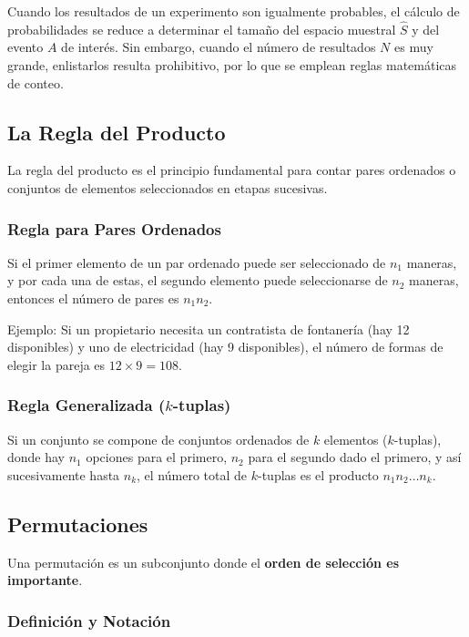 \documentclass[a4paper]{article}
\begin{document}
Cuando los resultados de un experimento son igualmente probables, el cálculo de probabilidades se reduce a determinar el tamaño del espacio muestral $\hat{S}$ y del evento $A$ de interés. Sin embargo, cuando el número de resultados $N$ es muy grande, enlistarlos resulta prohibitivo, por lo que se emplean reglas matemáticas de conteo.

\subsection{La Regla del Producto}

La regla del producto es el principio fundamental para contar pares ordenados o conjuntos de elementos seleccionados en etapas sucesivas.

\subsubsection{Regla para Pares Ordenados}

Si el primer elemento de un par ordenado puede ser seleccionado de $n_1$ maneras, y por cada una de estas, el segundo elemento puede seleccionarse de $n_2$ maneras, entonces el número de pares es $n_1 n_2$. 

Ejemplo: Si un propietario necesita un contratista de fontanería (hay 12 disponibles) y uno de electricidad (hay 9 disponibles), el número de formas de elegir la pareja es $12 \times 9 = 108$.

\subsubsection{Regla Generalizada ($k$-tuplas)}

Si un conjunto se compone de conjuntos ordenados de $k$ elementos ($k$-tuplas), donde hay $n_1$ opciones para el primero, $n_2$ para el segundo dado el primero, y así sucesivamente hasta $n_k$, el número total de $k$-tuplas es el producto $n_1 n_2 \dots n_k$.

\subsection{Permutaciones}

Una permutación es un subconjunto donde el \textbf{orden de selección es importante}.

\subsubsection{Definición y Notación}
\end{document}

